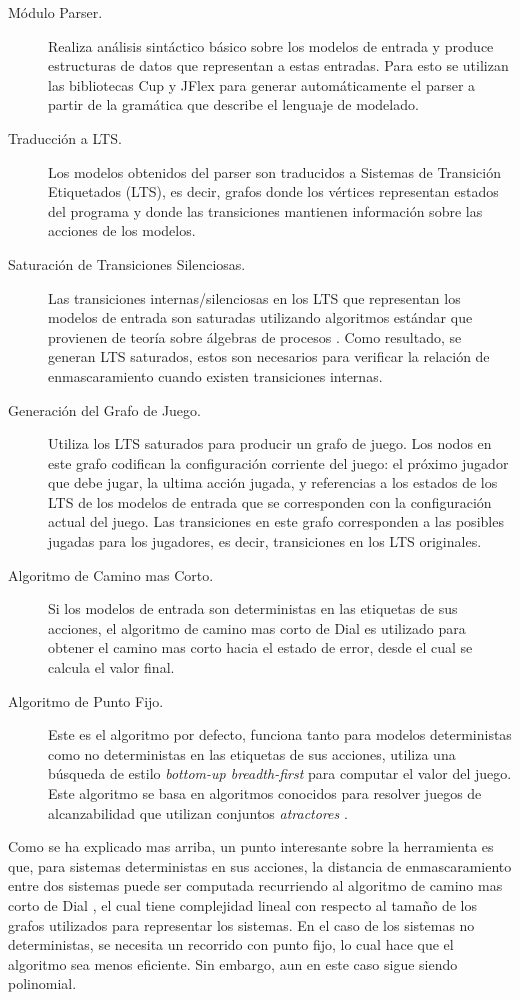 \begin{description}
    \item[Módulo Parser.] Realiza análisis sintáctico básico sobre los modelos de entrada y produce estructuras de datos que representan a  estas entradas. Para esto se utilizan las bibliotecas \textsf{Cup} y 
    \textsf{JFlex} para generar automáticamente el parser a partir de la gramática que describe el lenguaje de modelado.
    \item[Traducción a LTS.] Los modelos obtenidos del parser son traducidos a Sistemas de Transición Etiquetados (LTS), es decir, 
    grafos donde los vértices representan estados del programa y donde las transiciones mantienen información sobre las acciones de los modelos. 
    \item[Saturación de Transiciones Silenciosas.] Las transiciones internas/silenciosas en los LTS que representan los modelos de entrada son saturadas utilizando algoritmos estándar que provienen de teoría sobre álgebras de procesos \cite{Milner89}. Como resultado, se generan LTS saturados, estos son necesarios para verificar la relación de enmascaramiento cuando existen transiciones internas.
    \item[Generación del Grafo de Juego.] Utiliza los LTS saturados para producir un grafo de juego. Los nodos en este grafo codifican la configuración corriente del juego: 
    el próximo jugador que debe jugar, la ultima acción jugada, y referencias a los estados de los LTS de los modelos de entrada que se corresponden con la configuración actual del juego. 
    Las transiciones en este grafo corresponden a las posibles jugadas para los jugadores, es decir,  transiciones en los LTS originales.
    \item[Algoritmo de Camino mas Corto.] Si los modelos de entrada son deterministas en las etiquetas de sus acciones, el algoritmo de camino mas corto de Dial es utilizado para obtener el camino mas corto hacia el estado de error, desde el cual se calcula el valor final.
    \item[Algoritmo de Punto Fijo.] Este es el algoritmo por defecto, funciona tanto para modelos deterministas como no deterministas en las etiquetas de sus acciones, utiliza una búsqueda de estilo \textit{bottom-up breadth-first} para computar el valor del juego. 
    Este algoritmo se basa en algoritmos conocidos para resolver juegos de alcanzabilidad que utilizan conjuntos \emph{atractores} \cite{Jurd11}. 
\end{description}
Como se ha explicado mas arriba, un punto interesante sobre la herramienta es que, para sistemas deterministas en sus acciones, la distancia de enmascaramiento entre dos sistemas puede ser computada recurriendo al algoritmo de camino mas corto de Dial \cite{Dial69}, el cual tiene complejidad lineal con respecto al tamaño de los grafos utilizados para representar los sistemas.
En el caso de los sistemas no deterministas, se necesita un recorrido con punto fijo, lo cual hace que el algoritmo sea menos eficiente. Sin embargo, aun en este caso sigue siendo polinomial. 

